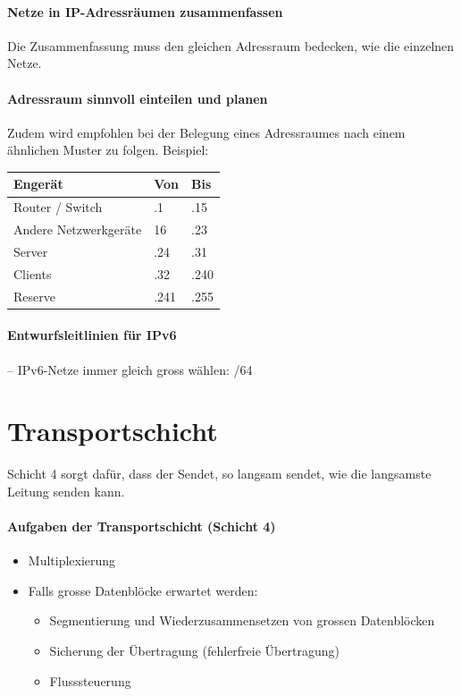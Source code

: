 \documentclass[a4paper,12pt]{article}
\begin{document}
\paragraph{Netze in IP-Adressräumen zusammenfassen}
Die Zusammenfassung muss den gleichen Adressraum bedecken, wie die einzelnen Netze.


\paragraph{Adressraum sinnvoll einteilen und planen}

Zudem wird empfohlen bei der Belegung eines Adressraumes nach einem ähnlichen Muster zu folgen. Beispiel:
\begin{center}
\begin{tabular}{|m{4cm}| m{1cm} |m{1cm}|} 
Engerät & Von & Bis\\
\hline
Router / Switch & .1 & .15\\
Andere Netzwerkgeräte & 16 & .23\\
Server & .24 & .31\\
Clients & .32 & .240\\
Reserve & .241 & .255\\
\end{tabular}
\end{center}

\paragraph{Entwurfsleitlinien für IPv6} -- IPv6-Netze immer gleich gross wählen: /64

\newpage
\section{Transportschicht}
Schicht 4 sorgt dafür, dass der Sendet, so langsam sendet, wie die langsamste Leitung senden kann.

\paragraph{Aufgaben der Transportschicht (Schicht 4)} 
\begin{itemize}
\item Multiplexierung
\item Falls grosse Datenblöcke erwartet werden:
    \begin{itemize}
    \item Segmentierung und Wiederzusammensetzen von grossen Datenblöcken
    \item Sicherung der Übertragung (fehlerfreie Übertragung)
    \item Flusssteuerung
    \end{itemize}
\end{itemize}
\end{document}
